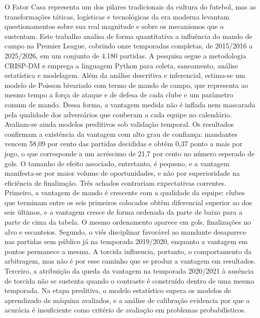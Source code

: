 
\begin{resumoutfpr}%
O Fator Casa representa um dos pilares tradicionais da cultura do futebol, mas
as transformações táticas, logísticas e tecnológicas da era moderna levantam
questionamentos sobre sua real magnitude e sobre os mecanismos que o sustentam.
Este trabalho analisa de forma quantitativa a influência do mando de campo na
Premier League, cobrindo onze temporadas completas, de 2015/2016 a 2025/2026,
em um conjunto de 4.180 partidas. A pesquisa segue a metodologia CRISP-DM e
emprega a linguagem Python para coleta, saneamento, análise estatística e
modelagem. Além da análise descritiva e inferencial, estima-se um modelo de
Poisson bivariado com termo de mando de campo, que representa ao mesmo
tempo a força de ataque e de defesa de cada clube e um parâmetro comum de mando.
Dessa forma, a vantagem medida não é inflada nem mascarada pela qualidade dos
adversários que couberam a cada equipe no calendário. Avaliam-se ainda modelos
preditivos sob validação temporal. Os resultados confirmam a existência da
vantagem com alto grau de confiança: mandantes vencem 58,09 por cento das
partidas decididas e obtêm 0,37 ponto a mais por jogo, o que corresponde a um
acréscimo de 21,7 por cento no número esperado de gols. O tamanho de efeito
associado, entretanto, é pequeno, e a vantagem manifesta-se por maior volume de
oportunidades, e não por superioridade na eficiência de finalização. Três
achados contrariam expectativas correntes. Primeiro, a vantagem de mando é
crescente com a qualidade da equipe: clubes que terminam entre os seis primeiros
colocados obtêm diferencial superior ao dos seis últimos, e a vantagem cresce de
forma ordenada da parte de baixo para a parte de cima da tabela. O mesmo
ordenamento aparece em gols, finalizações no alvo e escanteios. Segundo, o viés
disciplinar favorável ao mandante desaparece nas partidas sem público já na
temporada 2019/2020, enquanto a vantagem em pontos permanece a mesma. A
torcida influencia, portanto, o comportamento da arbitragem, mas não é por esse
caminho que se produz a vantagem em resultados. Terceiro, a
atribuição da queda da vantagem na temporada 2020/2021 à ausência de torcida não
se sustenta quando o contraste é construído dentro de uma mesma temporada. Na
etapa preditiva, o modelo estatístico supera os modelos de aprendizado de
máquina avaliados, e a análise de calibração evidencia por que a acurácia é
insuficiente como critério de avaliação em problemas probabilísticos.
\end{resumoutfpr}

